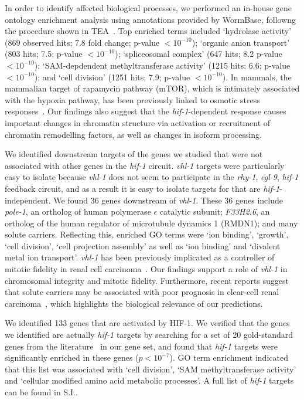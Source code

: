 \documentclass[9pt,twocolumn,twoside]{pnas-new}
\newcommand{\egl}{\emph{egl-9}}
\newcommand{\rhy}{\emph{rhy-1}}
\newcommand{\vhl}{\emph{vhl-1}}
\newcommand{\hif}{\emph{hif-1}}
\newcommand{\hifp}{HIF-1}
\newcommand{\vhltargets}{36}
\newcommand{\hiftargets}{133}
\begin{document}
In order to identify affected biological processes, we performed an in-house gene ontology enrichment analysis using annotations provided by WormBase, followng the procedure shown in TEA~\cite{Angeles-Albores2016}. Top enriched terms included `hydrolase activity' (869 observed hits; 7.8 fold change; p-value $<10^{-10}$); `organic anion transport' (803 hits; 7.5; p-value $<10^{-10}$); `spliceosomal complex' (647 hits; 8.2 p-value $<10^{-10}$); `SAM-depdendent methyltransferase activity' (1215 hits; 6.6; p-value $<10^{-10}$); and `cell division' (1251 hits; 7.9; p-value $<10^{-10}$).
In mammals, the mammalian target of rapamycin pathway (mTOR), which is intimately associated with the hypoxia pathway, has been previously linked to osmotic stress responses~\cite{Zhou2007}. Our findings also suggest that the \hif{}-dependent response causes important changes in chromatin structure via activation or recruitment of chromatin remodelling factors, as well as changes in isoform processing.

We identified downstream targets of the genes we studied that were not associated with other genes in the \hif{} circuit. \vhl{} targets were particularly easy to isolate because \vhl{} does not seem to participate in the \rhy{}, \egl{}, \hif{} feedback circuit, and as a result it is easy to isolate targets for that are \hif{}-independent. We found \vhltargets{} genes downstream of \vhl{}. These \vhltargets{} genes include \emph{pole-1}, an ortholog of human polymerase $\epsilon$ catalytic subunit; \emph{F33H2.6}, an ortholog of the human regulator of microtubule dynamics 1 (RMDN1)\cite{}; and many solute carriers.
Reflecting this, enriched GO terms were `ion binding', `growth', `cell division', `cell projection assembly' as well as `ion binding' and `divalent metal ion transport'. \vhl{} has been previously implicated as a controller of mitotic fidelity in renal cell carcinoma~\cite{Hell2014}. Our findings support a role of \vhl{} in chromosomal integrity and mitotic fidelity. Furthermore, recent reports suggest that solute carriers may be associated with poor prognosis in clear-cell renal carcinoma~\cite{Liu2015}, which highlights the biological relevance of our predictions.

We identified \hiftargets{} genes that are activated by \hifp{}. We verified that the genes we identified are actually \hif{} targets by searching for a set of 20 gold-standard genes from the literature~\cite{Shen2006,Shen2005} in our gene set, and found that \hif{} targets were significantly enriched in these genes ($p<10^{-7}$). GO term enrichment indicated that this list was associated with `cell division', `SAM methyltransferase activity' and `cellular modified amino acid metabolic processes'. A full list of \hif{} targets can be found in S.I..
\end{document}
